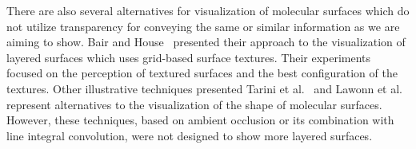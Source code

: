There are also several alternatives for visualization of molecular surfaces which do not utilize transparency for conveying the same or similar information as we are aiming to show.
Bair and House~\cite{Bair2007} presented their approach to the visualization of layered surfaces which uses grid-based surface textures.
Their experiments focused on the perception of textured surfaces and the best configuration of the textures. 
Other illustrative techniques presented Tarini et al.~\cite{Tarini2006} and Lawonn et al.~\cite{Lawonn2014} represent alternatives to the visualization of the shape of molecular surfaces. 
However, these techniques, based on ambient occlusion or its combination with line integral convolution, were not designed to show more layered surfaces.









